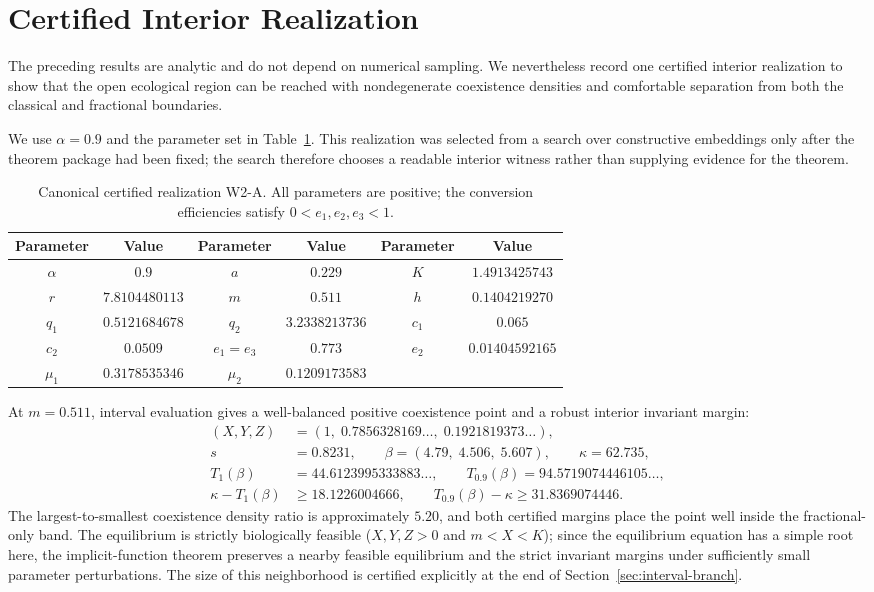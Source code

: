 \section{Certified Interior Realization}\label{sec:certified}

The preceding results are analytic and do not depend on numerical sampling. We nevertheless record one certified interior realization to show that the open ecological region can be reached with nondegenerate coexistence densities and comfortable separation from both the classical and fractional boundaries.

We use \(\alpha=0.9\) and the parameter set in Table~\ref{tab:w2a}. This realization was selected from a search over constructive embeddings only after the theorem package had been fixed; the search therefore chooses a readable interior witness rather than supplying evidence for the theorem.

\begin{table}[!htbp]
\centering
\caption{Canonical certified realization W2-A. All parameters are positive; the conversion efficiencies satisfy \(0<e_1,e_2,e_3<1\).}
\label{tab:w2a}
\begin{tabular}{cccccc}
\toprule
Parameter & Value & Parameter & Value & Parameter & Value\\
\midrule
\(\alpha\) & \(0.9\) &
\(a\) & \(0.229\) &
\(K\) & \(1.4913425743\)\\
\(r\) & \(7.8104480113\) &
\(m\) & \(0.511\) &
\(h\) & \(0.1404219270\)\\
\(q_1\) & \(0.5121684678\) &
\(q_2\) & \(3.2338213736\) &
\(c_1\) & \(0.065\)\\
\(c_2\) & \(0.0509\) &
\(e_1=e_3\) & \(0.773\) &
\(e_2\) & \(0.01404592165\)\\
\(\mu_1\) & \(0.3178535346\) &
\(\mu_2\) & \(0.1209173583\) &
 & \\
\bottomrule
\end{tabular}
\end{table}

At \(m=0.511\), interval evaluation gives a well-balanced positive coexistence point and a robust interior invariant margin:
\begin{align}
 (X,Y,Z)&=(1,\;0.7856328169\ldots,\;0.1921819373\ldots),\label{eq:w2a-densities}\\
 s&=0.8231,\qquad \beta=(4.79,\;4.506,\;5.607),\qquad \kappa=62.735,\label{eq:w2a-invariants}\\
 T_1(\beta)&=44.6123995333883\ldots,\qquad
 T_{0.9}(\beta)=94.5719074446105\ldots,\\
 \kappa-T_1(\beta)&\ge18.1226004666,\qquad
 T_{0.9}(\beta)-\kappa\ge31.8369074446.\label{eq:w2a-margins}
\end{align}
The largest-to-smallest coexistence density ratio is approximately \(5.20\), and both certified margins place the point well inside the fractional-only band. The equilibrium is strictly biologically feasible (\(X,Y,Z>0\) and \(m<X<K\)); since the equilibrium equation has a simple root here, the implicit-function theorem preserves a nearby feasible equilibrium and the strict invariant margins under sufficiently small parameter perturbations. The size of this neighborhood is certified explicitly at the end of Section~\ref{sec:interval-branch}.

